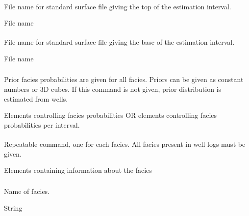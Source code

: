 \paragraph{}{
 \slist
   \item \Description File name for standard surface file giving the top of the estimation interval.
   \item \Argument File name
   \item \Default
 \elist

\paragraph{}
 \slist
   \item \Description File name for standard surface file giving the base of the estimation interval.
   \item \Argument File name
   \item \Default
 \elist

\subsubsection{}
 \slist
   \item \Description Prior facies probabilities are given for all
     facies. Priors can be given as constant numbers or 3D
     cubes. If this command is not given, prior distribution is
     estimated from wells.
   \item \Argument Elements controlling facies probabilities OR elements controlling facies probabilities per interval.
   \item \Default
 \elist

\paragraph{}
 \slist
   \item \Description Repeatable command, one for each facies. All facies present in well logs must be given.
   \item \Argument Elements containing information about the facies
   \item \Default
 \elist

\subparagraph{}
 \slist
   \item \Description Name of facies.
   \item \Argument String
   \item \Default
 \elist

}
